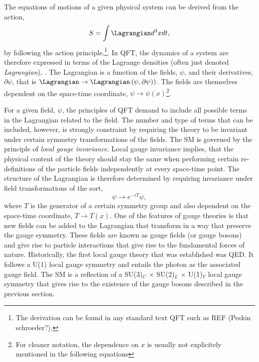 The equations of motions of a given physical system can be derived from the action,
\begin{equation}
  \label{eq:action}
  S = \int \Lagrangian d^3x dt,
\end{equation}
by following the action principle.\footnote{The derivation can be found in any standard text QFT such as REF (Peskin schroeder?).}.
In QFT, the dynamics of a system are therefore expressed in terms of the Lagrange densities (often just denoted \emph{Lagrangian}), \Lagrangian. 
The Lagrangian is a function of the fields, $\psi$, and their derivatives, $\partial \psi$, that is $\Lagrangian \rightarrow \Lagrangian\left(\psi, \partial\psi)\right)$. The fields are themselves dependent on the space-time coordinate, $\psi \rightarrow \psi(x)$\footnote{For cleaner notation, the dependence on $x$ is usually not explicitely mentioned in the following equations}. 

For a given field, $\psi$, the principles of QFT demand to include all possible terms in the Lagrangian related to the field. 
The number and type of terms that can be included, however, is strongly constraint by requiring the theory to be invariant under certain symmetry transformations of the fields. 
The SM is governed by the principle of \emph{local gauge invariance}. 
Local gauge invariance implies, that the physical content of the theory should stay the same when performing certain re-definitions of the particle fields independently at every space-time point.
The structure of the Lagrangian is therefore determined by requiring invariance under field transformations of the sort,
\begin{equation}
  \psi \rightarrow e^{-iT} \psi,
\end{equation}
where $T$ is the generator of a certain symmetry group and also dependent on the space-time coordinate, $T \rightarrow T(x)$. 
One of the features of gauge theories is that new fields can be added to the Lagrangian that transform in a way that preserve the gauge symmetry. 
These fields are known as gauge fields (or gauge bosons) and give rise to particle interactions that give rise to the fundamental forces of nature. 
Historically, the first local gauge theory that was established was QED. It follows a U(1) local gauge symmetry and entails the photon as the associated gauge field. 
The SM is a reflection of a SU(3)$_C$ $\times$ SU(2)$_L$ $\times$ U(1)$_Y$ local gauge symmetry that gives rise to the existence of the gauge bosons described in the previous section.


